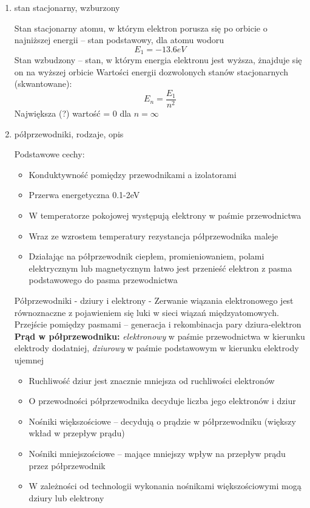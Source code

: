 \documentclass[12pt,a4paper]{article}
\begin{document}
\begin {enumerate}
\item stan stacjonarny, wzburzony

Stan stacjonarny atomu, w którym elektron porusza się po orbicie o najniższej energii -- stan podstawowy, dla atomu wodoru
$$E_1 = -13.6eV$$
Stan wzbudzony -- stan, w którym energia elektronu jest wyższa, żnajduje się on na wyższej orbicie
Wartości energii dozwolonych stanów stacjonarnych (skwantowane):
$$E_n = \frac{E_1}{n^2}$$
Największa (?) wartość = 0 dla $n=\infty$

\item półprzewodniki, rodzaje, opis

Podstawowe cechy:
\begin{itemize}
\item Konduktywność pomiędzy przewodnikami a izolatorami
\item Przerwa energetyczna 0.1-2eV
\item W temperatorze pokojowej występują elektrony w paśmie przewodnictwa
\item Wraz ze wzrostem temperatury rezystancja półprzewodnika maleje
\item Działając na półprzewodnik ciepłem, promieniowaniem, polami elektrycznym lub magnetycznym łatwo jest przenieść elektron z pasma podstawowego do pasma przewodnictwa
\end{itemize}

Półprzewodniki - dziury i elektrony - Zerwanie wiązania elektronowego jest równoznaczne z pojawieniem się luki w sieci wiązań międzyatomowych. \\

Przejście pomiędzy pasmami -- generacja i rekombinacja pary dziura-elektron\\

\textbf{Prąd w półprzewodniku:} \emph{elektronowy} w paśmie przewodnictwa w kierunku elektrody dodatniej, \emph{dziurowy} w paśmie podstawowym w kierunku elektrody ujemnej
\begin{itemize}
\item Ruchliwość dziur jest znacznie mniejsza od ruchliwości elektronów
\item O przewodności półprzewodnika decyduje liczba jego elektronów i dziur
\item Nośniki większościowe -- decydują o prądzie w półprzewodniku (większy wkład w przepływ prądu)
\item Nośniki mniejszościowe -- mające mniejszy wpływ na przepływ prądu przez półprzewodnik
\item W zależności od technologii wykonania nośnikami większościowymi mogą dziury lub elektrony
\end{itemize}


\end{enumerate}
\end{document}
